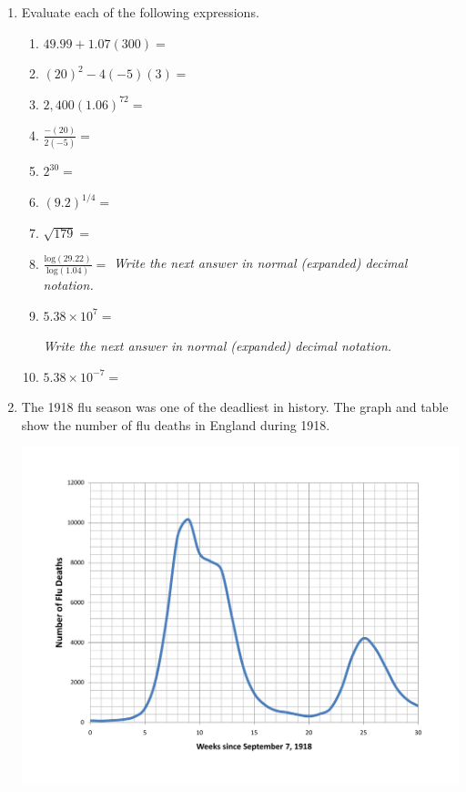 \documentclass[12pt]{article}
\begin{document}
  \vspace{.2in}
 
 \hrulefill
 
\newpage  %

\begin{enumerate}
\item Evaluate each of the following expressions.

\begin{enumerate}
\item $49.99 + 1.07(300)=$
\vfill
\item $(20)^2-4(-5)(3)=$
\vfill
\item $2,400(1.06)^{72}=$
\vfill
\item $\displaystyle \frac{-(20)}{2(-5)}=$
\vfill
\item $2^{30}=$
\vfill
\item $(9.2)^{1/4}=$
\vfill
\item $\sqrt{179}=$
\vfill
\item $\displaystyle \frac{\text{log}(29.22)}{\text{log}(1.04)}=$
\vfill
\emph{Write the next answer in normal (expanded) decimal notation.}
\item $5.38 \times 10^{7}=$  


\vfill
\emph{Write the next answer in normal (expanded) decimal notation.}
\item $5.38 \times 10^{-7}=$  


\vfill
\end{enumerate}

\newpage  %

\item The 1918 flu season was one of the deadliest in history.  The graph and table show the number of flu deaths in England during 1918.

\begin{center}
\includegraphics [width = .7\textwidth] {EnglandFlu.pdf}
\end{center}


\end{enumerate}
\end{document}

